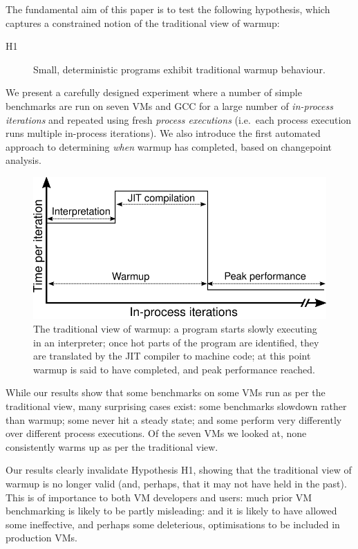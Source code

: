 \documentclass[preprint,numbers,10pt]{sigplanconf}
\newcommand{\hypone}{H1\xspace}
\begin{document}
The fundamental aim of this paper is to test the following hypothesis, which captures a constrained
notion of the traditional view of warmup:
\begin{description}
  \item[\hypone] Small, deterministic programs exhibit traditional warmup behaviour.
\end{description}
We present a carefully designed
experiment where a number of simple benchmarks are run on seven
VMs and GCC for a large number of \emph{in-process iterations} and repeated using fresh
\emph{process executions} (i.e.~each process execution runs multiple in-process
iterations). We also introduce the first automated approach to determining
\emph{when} warmup has completed, based on changepoint analysis.

\begin{figure}[t]
\centering
\includegraphics[width=.475\textwidth]{img/picturebook_warmup}
\caption{The traditional view of warmup: a program starts slowly executing in
an interpreter; once hot parts of the program are identified, they are
translated by the JIT compiler to machine code; at this point warmup
is said to have completed, and peak performance reached.}
\label{fig:trad}
\end{figure}

While our results show that some benchmarks on some VMs run as per the traditional
view, many surprising cases exist: some benchmarks slowdown rather than
warmup; some never hit a steady state; and some perform very differently over
different process executions. Of the seven
VMs we looked at, none consistently warms up as per the traditional view.

Our results clearly invalidate Hypothesis H1, showing that the traditional
view of warmup is no longer valid (and, perhaps, that it may not have held in
the past). This is of importance to both VM developers and users:
much prior VM benchmarking is likely to be partly misleading: and it is
likely to have allowed some ineffective, and perhaps some deleterious,
optimisations to be included in production VMs.

\vspace{10pt}
\end{document}
